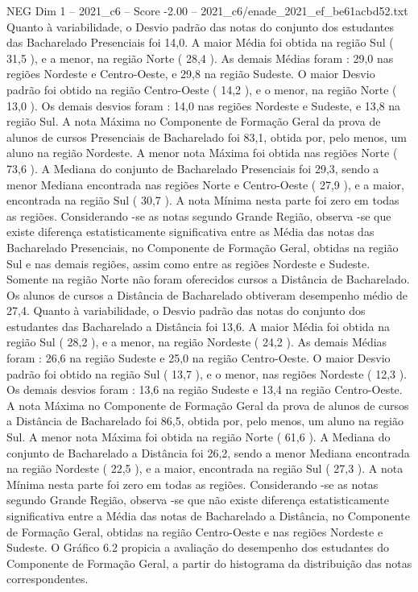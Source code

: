 \begin{textsample}{NEG Dim 1 – 2021\_c6 – Score -2.00 – 2021\_c6/enade\_2021\_ef\_be61acbd52.txt}
Quanto à variabilidade, o Desvio padrão das notas do conjunto dos estudantes das Bacharelado Presenciais foi 14,0.
A maior Média foi obtida na região Sul ( 31,5 ), e a menor, na região Norte ( 28,4 ).
As demais Médias foram : 29,0 nas regiões Nordeste e Centro-Oeste, e 29,8 na região Sudeste.
O maior Desvio padrão foi obtido na região Centro-Oeste ( 14,2 ), e o menor, na região Norte ( 13,0 ).
Os demais desvios foram : 14,0 nas regiões Nordeste e Sudeste, e 13,8 na região Sul.
A nota Máxima no Componente de Formação Geral da prova de alunos de cursos Presenciais de Bacharelado foi 83,1, obtida por, pelo menos, um aluno na região Nordeste.
A menor nota Máxima foi obtida nas regiões Norte ( 73,6 ).
A Mediana do conjunto de Bacharelado Presenciais foi 29,3, sendo a menor Mediana encontrada nas regiões Norte e Centro-Oeste ( 27,9 ), e a maior, encontrada na região Sul ( 30,7 ).
A nota Mínima nesta parte foi zero em todas as regiões.
Considerando -se as notas segundo Grande Região, observa -se que existe diferença estatisticamente significativa entre as Média das notas das Bacharelado Presenciais, no Componente de Formação Geral, obtidas na região Sul e nas demais regiões, assim como entre as regiões Nordeste e Sudeste.
Somente na região Norte não foram oferecidos cursos a Distância de Bacharelado.
Os alunos de cursos a Distância de Bacharelado obtiveram desempenho médio de 27,4.
Quanto à variabilidade, o Desvio padrão das notas do conjunto dos estudantes das Bacharelado a Distância foi 13,6.
A maior Média foi obtida na região Sul ( 28,2 ), e a menor, na região Nordeste ( 24,2 ).
As demais Médias foram : 26,6 na região Sudeste e 25,0 na região Centro-Oeste.
O maior Desvio padrão foi obtido na região Sul ( 13,7 ), e o menor, nas regiões Nordeste ( 12,3 ).
Os demais desvios foram : 13,6 na região Sudeste e 13,4 na região Centro-Oeste.
A nota Máxima no Componente de Formação Geral da prova de alunos de cursos a Distância de Bacharelado foi 86,5, obtida por, pelo menos, um aluno na região Sul.
A menor nota Máxima foi obtida na região Norte ( 61,6 ).
A Mediana do conjunto de Bacharelado a Distância foi 26,2, sendo a menor Mediana encontrada na região Nordeste ( 22,5 ), e a maior, encontrada na região Sul ( 27,3 ).
A nota Mínima nesta parte foi zero em todas as regiões.
Considerando -se as notas segundo Grande Região, observa -se que não existe diferença estatisticamente significativa entre a Média das notas de Bacharelado a Distância, no Componente de Formação Geral, obtidas na região Centro-Oeste e nas regiões Nordeste e Sudeste.
O Gráfico 6.2 propicia a avaliação do desempenho dos estudantes do Componente de Formação Geral, a partir do histograma da distribuição das notas correspondentes.

\end{textsample}
